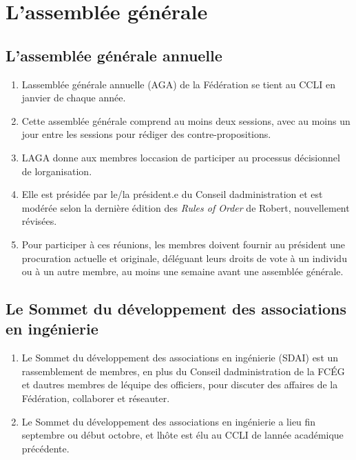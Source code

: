 \section{L'assemblée générale}
\label{l-assemblee-generale}

\subsection{L'assemblée générale annuelle}
\label{l-assemblee-generale-annuelle}

\begin{enumerate}
 \item
  L\textquotesingle assemblée générale annuelle (AGA) de la Fédération se tient au CCLI en janvier de chaque année.
 \item
  Cette assemblée générale comprend au moins deux sessions, avec au moins un jour entre les sessions pour rédiger des contre-propositions.
 \item
  L\textquotesingle AGA donne aux membres l\textquotesingle occasion de participer au processus décisionnel de l\textquotesingle organisation.
 \item
  Elle est présidée par le/la président.e du Conseil d\textquotesingle administration et est modérée selon la dernière édition des \emph{Rules of Order} de Robert, nouvellement révisées.
 \item
  Pour participer à ces réunions, les membres doivent fournir au président une procuration actuelle et originale, déléguant leurs droits de vote à un individu ou à un autre membre, au moins une semaine avant une assemblée générale.
\end{enumerate}

\subsection{Le Sommet du développement des associations en ingénierie}
\label{le-sommet-du-developpement-des-associations-en-ingenierie}

\begin{enumerate}
 \item
  Le Sommet du développement des associations en ingénierie (SDAI) est un rassemblement de membres, en plus du Conseil d\textquotesingle administration de la FCÉG et d\textquotesingle autres membres de l\textquotesingle équipe des officiers, pour discuter des affaires de la Fédération, collaborer et réseauter.
 \item
  Le Sommet du développement des associations en ingénierie a lieu fin septembre ou début octobre, et l\textquotesingle hôte est élu au CCLI de l\textquotesingle année académique précédente.
\end{enumerate}

